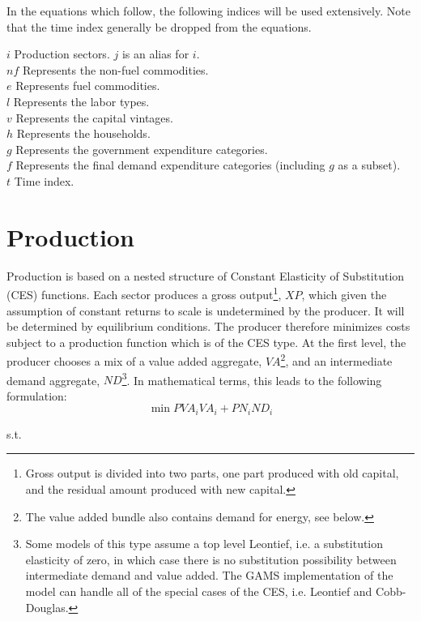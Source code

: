 \documentclass[12pt]{article}
\begin{document}
In the equations which follow, the following indices will be used extensively. Note that the time index generally be dropped from the equations.
{
\small

$i$	Production sectors. $j$ is an alias for $i$.\\
$nf$	Represents the non-fuel commodities.\\
$e$	Represents fuel commodities.\\
$l$	Represents the labor types.\\
$v$	Represents the capital vintages.\\
$h$	Represents the households.\\
$g$	Represents the government expenditure categories.\\
$f$	Represents the final demand expenditure categories (including $g$ as a subset).\\
$t$	Time index.\\

}

\section{Production}
Production is based on a nested structure of Constant Elasticity of Substitution (CES) functions. Each sector produces a gross output\footnote{Gross output is divided into two parts, one part produced with old capital, and the residual amount produced with new capital.}, $XP$, which given the assumption of constant returns to scale is undetermined by the producer. It will be determined by equilibrium conditions. The producer therefore minimizes costs subject to a production function which is of the CES type. At the first level, the producer chooses a mix of a value added aggregate, $VA$\footnote{The value added bundle also contains demand for energy, see below.}, and an intermediate demand aggregate, $ND$\footnote{Some models of this type assume a top level Leontief, i.e. a substitution elasticity of zero, in which case there is no substitution possibility between intermediate demand and value added. The GAMS implementation of the model can handle all of the special cases of the CES, i.e. Leontief and Cobb-Douglas.}.  In mathematical terms, this leads to the following formulation:
$$
\min PV\!A_i  V\!A_i + PN_i N\!D_i
$$
{\centering s.t. \par}
\end{document}
